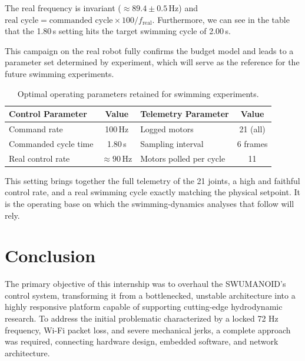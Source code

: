 \documentclass{tropLaClasse}
\begin{document}
The real frequency is invariant ($\approx 89.4 \pm 0.5$\,Hz) and $\text{real cycle} = \text{commanded cycle} \times 100/f_{\text{real}}$. Furthermore, we can see in the table that the 1.80\,s setting hits the target swimming cycle of 2.00\,s.

This campaign on the real robot fully confirms the budget model and leads to a parameter set determined by experiment, which will serve as the reference for the future swimming experiments. 

\begin{table}[H]
\centering
\small %
\begin{tabular}{|l|c||l|c|}
\hline
\textbf{Control Parameter} & \textbf{Value} & \textbf{Telemetry Parameter} & \textbf{Value} \\ \hline
Command rate & 100\,Hz & Logged motors & 21 (all) \\
Commanded cycle time & 1.80\,s & Sampling interval & 6 frames \\
Real control rate & $\approx 90$\,Hz & Motors polled per cycle & 11 \\ \hline
\end{tabular}
\caption{Optimal operating parameters retained for swimming experiments.}
\label{tab:optimal_params}
\end{table}

\vspace{-0.2cm}

This setting brings together the full telemetry of the 21 joints, a high and faithful control rate, and a real swimming cycle exactly matching the physical setpoint. It is the operating base on which the swimming-dynamics analyses that follow will rely.

\vspace{-0.1cm}

\section{Conclusion}


The primary objective of this internship was to overhaul the SWUMANOID's control system, transforming it from a bottlenecked, unstable architecture into a highly responsive platform capable of supporting cutting-edge hydrodynamic research. To address the initial problematic characterized by a locked 72 Hz frequency, Wi-Fi packet loss, and severe mechanical jerks, a complete approach was required, connecting hardware design, embedded software, and network architecture.
\end{document}
